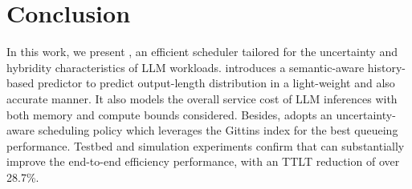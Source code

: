 \section{Conclusion}
\label{sec:conclusion}
In this work, we present \oursched, an efficient scheduler tailored for the uncertainty and hybridity characteristics of LLM workloads.
\oursched introduces a semantic-aware history-based predictor to predict output-length distribution in a light-weight and also accurate manner.
It also models the overall service cost of LLM inferences with both memory and compute bounds considered.
Besides, \oursched adopts an uncertainty-aware scheduling policy which leverages the Gittins index for the best queueing performance.
Testbed and simulation experiments confirm that \oursched can substantially improve the end-to-end efficiency performance, with an TTLT reduction of over 28.7\%.



